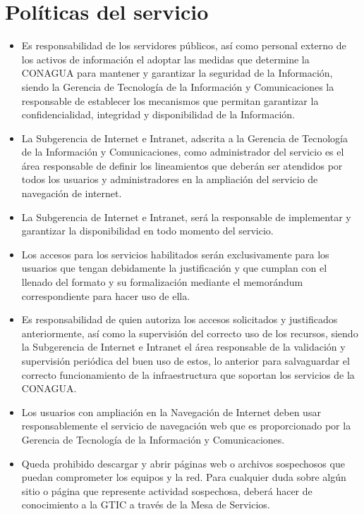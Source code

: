\documentclass[letterpaper,9pt]{article}
\begin{document}
\clearpage
\section*{Políticas del servicio}
{\small \begin{itemize}
	        \item 	Es responsabilidad de los servidores públicos, así como personal externo de los activos de información el adoptar las medidas que determine la CONAGUA para mantener y garantizar la seguridad de la Información, siendo la Gerencia de Tecnología de la Información y Comunicaciones la responsable de establecer los mecanismos que permitan garantizar la confidencialidad, integridad y disponibilidad de la Información.
	        \item 	La Subgerencia de Internet e Intranet, adscrita a la Gerencia de Tecnología de la Información y Comunicaciones, como administrador del servicio es el área responsable de definir los lineamientos que deberán ser atendidos por todos los usuarios y administradores en la ampliación del servicio de navegación de internet.
           \item La Subgerencia de Internet e Intranet, será la responsable de implementar y garantizar la disponibilidad en todo momento del servicio.
           \item Los accesos para los servicios habilitados serán exclusivamente para los usuarios que tengan debidamente la justificación y que cumplan con el llenado del formato y su formalización mediante el memorándum correspondiente para hacer uso de ella.
           \item Es responsabilidad de quien autoriza los accesos solicitados y justificados anteriormente, así como la supervisión del correcto uso de los recursos, siendo la Subgerencia de Internet e Intranet el área responsable de la validación y supervisión periódica del buen uso de estos, lo anterior para salvaguardar el correcto funcionamiento de la infraestructura que soportan los servicios de la CONAGUA.
           \item Los usuarios con ampliación en la Navegación de Internet deben usar responsablemente el servicio de navegación web que es proporcionado por la Gerencia de Tecnología de la Información y Comunicaciones.
           \item Queda prohibido descargar y abrir páginas web o archivos sospechosos que puedan comprometer los equipos y la red. Para cualquier duda sobre algún sitio o página que represente actividad sospechosa, deberá hacer de conocimiento a la GTIC a través de la Mesa de Servicios.

\end{itemize}}
\end{document}

